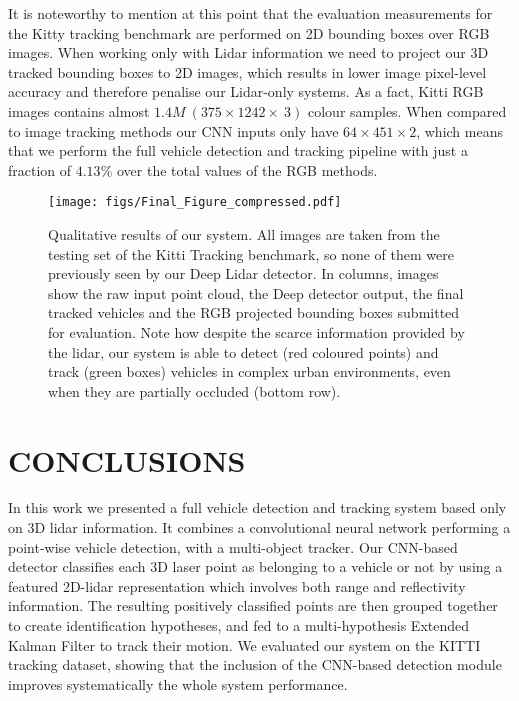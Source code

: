 \documentclass[letterpaper, 10 pt, conference]{ieeeconf}  %
\begin{document}
It is noteworthy to mention at this point that the evaluation measurements for the Kitty tracking benchmark are performed on 2D bounding boxes over RGB images. When working only with Lidar information we need to project our 3D tracked bounding boxes to 2D images, which results in lower image pixel-level accuracy and therefore penalise our Lidar-only systems. 
As a fact, Kitti RGB images contains almost $1.4M~(375\!\times1242\!\times~3)$ colour samples. When compared to image tracking methods our CNN inputs only have $64\!\times451\!\times2$, which means that we perform the full vehicle detection and tracking pipeline with just a fraction of $4.13\%$ over the total values of the RGB methods.

\begin{figure*}[t]
\centering
 \centerline{
  	\texttt{[image: figs/Final\_Figure\_compressed.pdf]}}
  \caption{Qualitative results of our system. All images are taken from the testing set of the Kitti Tracking benchmark, so none of them were previously seen by our Deep Lidar detector. In columns, images show the raw input point cloud, the Deep detector output, the final tracked vehicles and the RGB projected bounding boxes submitted for evaluation. Note how despite the scarce information provided by the lidar, our system is able to detect (red coloured points) and track (green boxes) vehicles in complex urban environments, even when they are partially occluded  (bottom row).}
  \label{fig:res}
\end{figure*}
\section{CONCLUSIONS}

In this work we presented a full vehicle detection and tracking system based only on 3D lidar information. It combines a convolutional neural network performing a point-wise vehicle detection, with a multi-object tracker. 
Our CNN-based detector classifies each 3D laser point as belonging to a vehicle or not by using a featured 2D-lidar representation which involves both range and reflectivity information. The resulting positively classified points are then grouped together to create identification hypotheses, and fed to a multi-hypothesis Extended Kalman Filter to track their motion.
We evaluated our system on the KITTI tracking dataset, showing that the inclusion of the CNN-based detection module improves systematically the whole system performance.





\end{document}

